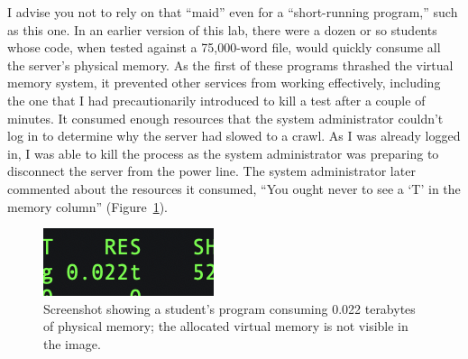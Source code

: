 I advise you not to rely on that ``maid'' even for a ``short-running program,'' such as this one.
In an earlier version of this lab, there were a dozen or so students whose code, when tested against a 75,000-word file, would quickly consume all the server's physical memory.
As the first of these programs thrashed the virtual memory system, it prevented other services from working effectively, including the one that I had precautionarily introduced to kill a test after a couple of minutes.
It consumed enough resources that the system administrator couldn't log in to determine why the server had slowed to a crawl.
As I was already logged in, I was able to kill the process as the system administrator was preparing to disconnect the server from the power line.
The system administrator later commented about the resources it consumed, ``You ought never to see a `T' in the memory column'' (Figure~\ref{fig:tooMuchMemoryUsed}).

\begin{figure}
    \center
    \includegraphics{too-much-memory-used}
    \caption{Screenshot showing a student's program consuming 0.022 terabytes of physical memory;
    the allocated virtual memory is not visible in the image.\label{fig:tooMuchMemoryUsed}}
\end{figure}

%
%

